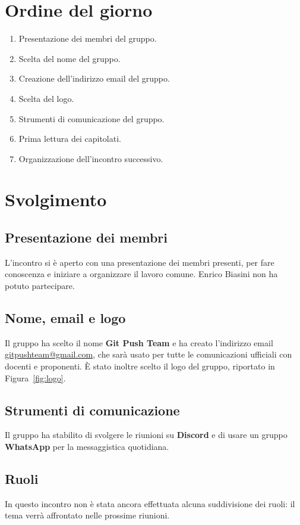 \documentclass[verbale=interno]{gpt}
\begin{document}
\section{Ordine del giorno}
\begin{enumerate}
  \item Presentazione dei membri del gruppo.
  \item Scelta del nome del gruppo.
  \item Creazione dell'indirizzo email del gruppo.
  \item Scelta del logo.
  \item Strumenti di comunicazione del gruppo.
  \item Prima lettura dei capitolati.
  \item Organizzazione dell'incontro successivo.
\end{enumerate}

\section{Svolgimento}

\subsection{Presentazione dei membri}
L'incontro si è aperto con una presentazione dei membri presenti, per
fare conoscenza e iniziare a organizzare il lavoro comune. Enrico Biasini
non ha potuto partecipare.

\subsection{Nome, email e logo}
Il gruppo ha scelto il nome \textbf{Git Push Team} e ha creato
l'indirizzo email \href{mailto:gitpushteam@gmail.com}{gitpushteam@gmail.com},
che sarà usato per tutte le comunicazioni ufficiali con docenti e
proponenti. È stato inoltre scelto il logo del gruppo, riportato in
Figura~\ref{fig:logo}.


\subsection{Strumenti di comunicazione}
Il gruppo ha stabilito di svolgere le riunioni su \textbf{Discord} e di
usare un gruppo \textbf{WhatsApp} per la messaggistica quotidiana.

\subsection{Ruoli}
In questo incontro non è stata ancora effettuata alcuna suddivisione dei
ruoli: il tema verrà affrontato nelle prossime riunioni.
\end{document}
